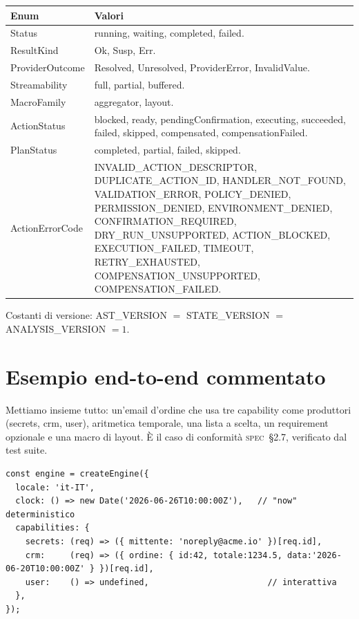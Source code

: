 \documentclass[11pt,a4paper]{book}
\newcommand{\ic}[1]{{\ttfamily #1}}
\theoremstyle{definition}
\newcommand{\spec}[1]{\textsc{spec}~\S#1}
\begin{document}
{{{{\begin{center}
\small
\begin{tabular}{@{}l p{9.4cm}@{}}
\toprule
\textbf{Enum} & \textbf{Valori} \\
\midrule
\ic{Status} & \ic{running}, \ic{waiting}, \ic{completed}, \ic{failed}. \\
\ic{ResultKind} & \ic{Ok}, \ic{Susp}, \ic{Err}. \\
\ic{ProviderOutcome} & \ic{Resolved}, \ic{Unresolved}, \ic{ProviderError}, \ic{InvalidValue}. \\
\ic{Streamability} & \ic{full}, \ic{partial}, \ic{buffered}. \\
\ic{MacroFamily} & \ic{aggregator}, \ic{layout}. \\
\ic{ActionStatus} & \ic{blocked}, \ic{ready}, \ic{pendingConfirmation}, \ic{executing},
\ic{succeeded}, \ic{failed}, \ic{skipped}, \ic{compensated}, \ic{compensationFailed}. \\
\ic{PlanStatus} & \ic{completed}, \ic{partial}, \ic{failed}, \ic{skipped}. \\
\ic{ActionErrorCode} & \ic{INVALID\_ACTION\_DESCRIPTOR}, \ic{DUPLICATE\_ACTION\_ID},
\ic{HANDLER\_NOT\_FOUND}, \ic{VALIDATION\_ERROR}, \ic{POLICY\_DENIED},
\ic{PERMISSION\_DENIED}, \ic{ENVIRONMENT\_DENIED}, \ic{CONFIRMATION\_REQUIRED},
\ic{DRY\_RUN\_UNSUPPORTED}, \ic{ACTION\_BLOCKED}, \ic{EXECUTION\_FAILED}, \ic{TIMEOUT},
\ic{RETRY\_EXHAUSTED}, \ic{COMPENSATION\_UNSUPPORTED}, \ic{COMPENSATION\_FAILED}. \\
\bottomrule
\end{tabular}
\end{center}

Costanti di versione: \ic{AST\_VERSION} $=$ \ic{STATE\_VERSION} $=$
\ic{ANALYSIS\_VERSION} $= 1$.

\chapter{Esempio end-to-end commentato}
\label{app:esempio}

Mettiamo insieme tutto: un'email d'ordine che usa tre capability come produttori
(\ic{secrets}, \ic{crm}, \ic{user}), aritmetica temporale, una lista a scelta, un
requirement opzionale e una macro di layout. È il caso di conformità \spec{2.7},
verificato dal test suite.

\begin{lstlisting}
const engine = createEngine({
  locale: 'it-IT',
  clock: () => new Date('2026-06-26T10:00:00Z'),   // "now" deterministico
  capabilities: {
    secrets: (req) => ({ mittente: 'noreply@acme.io' })[req.id],
    crm:     (req) => ({ ordine: { id:42, totale:1234.5, data:'2026-06-20T10:00:00Z' } })[req.id],
    user:    () => undefined,                        // interattiva
  },
});


\end{lstlisting}}}}}
\end{document}

